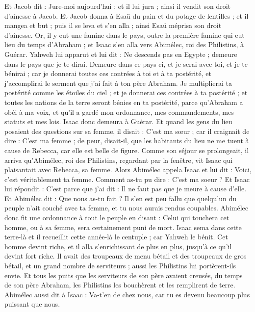 \begin{multicols}{2}
Et Jacob dit : Jure-moi aujourd'hui ; et il lui jura ; ainsi il vendit son droit d'aînesse à Jacob.
Et Jacob donna à Esaü du pain et du potage de lentilles ; et il mangea et but ; puis il se leva et s'en alla ; ainsi Esaü méprisa son droit d'aînesse.
\VerseOne{}Or, il y eut une famine dans le pays, outre la première famine qui eut lieu du temps d'Abraham ; et Isaac s'en alla vers Abimélec, roi des Philistins, à Guérar.
Yahweh lui apparut et lui dit : Ne descends pas en Egypte ; demeure dans le pays que je te dirai.
Demeure dans ce pays-ci, et je serai avec toi, et je te bénirai ; car je donnerai toutes ces contrées à toi et à ta postérité, et j’accomplirai le serment que j'ai fait à ton père Abraham.
Je multiplierai ta postérité comme les étoiles du ciel ; et je donnerai ces contrées à ta postérité ; et toutes les nations de la terre seront bénies en ta postérité,
parce qu'Abraham a obéi à ma voix, et qu'il a gardé mon ordonnance, mes commandements, mes statuts et mes lois.
Isaac donc demeura à Guérar.
Et quand les gens du lieu posaient des questions sur sa femme, il disait : C'est ma sœur ; car il craignait de dire : C'est ma femme ; de peur, disait-il, que les habitants du lieu ne me tuent à cause de Rebecca, car elle est belle de figure.
Comme son séjour se prolongeait, il arriva qu'Abimélec, roi des Philistins, regardant par la fenêtre, vit Isaac qui plaisantait avec Rebecca, sa femme.
Alors Abimélec appela Isaac et lui dit : Voici, c'est véritablement ta femme. Comment as-tu pu dire : C'est ma soeur ? Et Isaac lui répondit : C'est parce que j'ai dit : Il ne faut pas que je meure à cause d'elle.
Et Abimélec dit : Que nous as-tu fait ? Il s'en est peu fallu que quelqu'un du peuple n'ait couché avec ta femme, et tu nous aurais rendus coupables.
Abimélec donc fit une ordonnance à tout le peuple en disant : Celui qui touchera cet homme, ou à sa femme, sera certainement puni de mort.
Isaac sema dans cette terre-là et il recueillit cette année-là le centuple ; car Yahweh le bénit.
Cet homme devint riche, et il alla s’enrichissant de plus en plus, jusqu'à ce qu'il devint fort riche.
Il avait des troupeaux de menu bétail et des troupeaux de gros bétail, et un grand nombre de serviteurs ; aussi les Philistins lui portèrent-ils envie.
Et tous les puits que les serviteurs de son père avaient creusés, du temps de son père Abraham, les Philistins les bouchèrent et les remplirent de terre.
Abimélec aussi dit à Isaac : Va-t’en de chez nous, car tu es devenu beaucoup plus puissant que nous.

\end{multicols}
